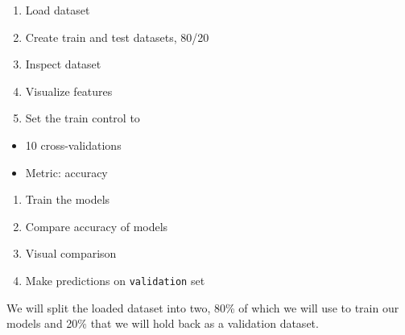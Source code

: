 \documentclass[]{book}
\newenvironment{Shaded}{\begin{snugshade}}{\end{snugshade}}
\newcommand{\CommentTok}[1]{\textcolor[rgb]{0.56,0.35,0.01}{\textit{#1}}}
\newcommand{\DataTypeTok}[1]{\textcolor[rgb]{0.13,0.29,0.53}{#1}}
\newcommand{\FloatTok}[1]{\textcolor[rgb]{0.00,0.00,0.81}{#1}}
\newcommand{\KeywordTok}[1]{\textcolor[rgb]{0.13,0.29,0.53}{\textbf{#1}}}
\newcommand{\NormalTok}[1]{#1}
\newcommand{\OperatorTok}[1]{\textcolor[rgb]{0.81,0.36,0.00}{\textbf{#1}}}
\newcommand{\OtherTok}[1]{\textcolor[rgb]{0.56,0.35,0.01}{#1}}
\newcommand{\StringTok}[1]{\textcolor[rgb]{0.31,0.60,0.02}{#1}}
\providecommand{\tightlist}{%
  \setlength{\itemsep}{0pt}\setlength{\parskip}{0pt}}
\begin{document}
\begin{enumerate}
\def\labelenumi{\arabic{enumi}.}
\tightlist
\item
  Load dataset
\item
  Create train and test datasets, 80/20
\item
  Inspect dataset
\item
  Visualize features
\item
  Set the train control to
\end{enumerate}

\begin{itemize}
\tightlist
\item
  10 cross-validations
\item
  Metric: accuracy
\end{itemize}

\begin{enumerate}
\def\labelenumi{\arabic{enumi}.}
\setcounter{enumi}{5}
\tightlist
\item
  Train the models
\item
  Compare accuracy of models
\item
  Visual comparison
\item
  Make predictions on \texttt{validation} set
\end{enumerate}

We will split the loaded dataset into two, 80\% of which we will use to train our models and 20\% that we will hold back as a validation dataset.

\begin{Shaded}
\end{Shaded}
\end{document}
